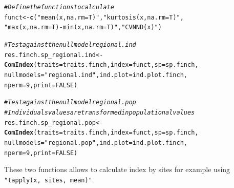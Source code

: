 \documentclass[12pt]{article}\usepackage[]{graphicx}\usepackage[]{color}
\makeatletter
\newcommand{\hlnum}[1]{\textcolor[rgb]{0.686,0.059,0.569}{#1}}%
\newcommand{\hlstr}[1]{\textcolor[rgb]{0.192,0.494,0.8}{#1}}%
\newcommand{\hlcom}[1]{\textcolor[rgb]{0.678,0.584,0.686}{\textit{#1}}}%
\newcommand{\hlstd}[1]{\textcolor[rgb]{0.345,0.345,0.345}{#1}}%
\newcommand{\hlkwb}[1]{\textcolor[rgb]{0.69,0.353,0.396}{#1}}%
\newcommand{\hlkwc}[1]{\textcolor[rgb]{0.333,0.667,0.333}{#1}}%
\newcommand{\hlkwd}[1]{\textcolor[rgb]{0.737,0.353,0.396}{\textbf{#1}}}%
\newenvironment{kframe}{%
 \def\at@end@of@kframe{}%
 \ifinner\ifhmode%
  \def\at@end@of@kframe{\end{minipage}}%
  \begin{minipage}{\columnwidth}%
 \fi\fi%
 \def\FrameCommand##1{\hskip\@totalleftmargin \hskip-\fboxsep
 \colorbox{shadecolor}{##1}\hskip-\fboxsep
     \hskip-\linewidth \hskip-\@totalleftmargin \hskip\columnwidth}%
 \MakeFramed {\advance\hsize-\width
   \@totalleftmargin\z@ \linewidth\hsize
   \@setminipage}}%
 {\par\unskip\endMakeFramed%
 \at@end@of@kframe}
\newenvironment{knitrout}{}{} %
\newcommand{\code}[1]{{{\tt #1}}}
\makeatother
\begin{document}
\begin{knitrout}
\color{fgcolor}\begin{kframe}
\begin{alltt}
\hlcom{#Define the function s to calculate}
\hlstd{funct}\hlkwb{<-}\hlkwd{c}\hlstd{(}\hlstr{"mean(x, na.rm = T)"}\hlstd{,} \hlstr{"kurtosis(x, na.rm = T)"}\hlstd{,}
     \hlstr{"max(x, na.rm = T) - min(x, na.rm = T)"}\hlstd{,} \hlstr{"CVNND(x)"} \hlstd{)}

\hlcom{#Test against the null model regional.ind}
\hlstd{res.finch.sp_regional.ind}\hlkwb{<-}\hlkwd{ComIndex}\hlstd{(}\hlkwc{traits} \hlstd{= traits.finch,} \hlkwc{index} \hlstd{= funct,} \hlkwc{sp} \hlstd{= sp.finch,}
                           \hlkwc{nullmodels} \hlstd{=} \hlstr{"regional.ind"}\hlstd{,} \hlkwc{ind.plot} \hlstd{= ind.plot.finch,}
                            \hlkwc{nperm} \hlstd{=} \hlnum{9}\hlstd{,} \hlkwc{print} \hlstd{=} \hlnum{FALSE}\hlstd{)}
\end{alltt}


{\ttfamily\noindent\bfseries{}}\begin{alltt}
\hlcom{#Test against the null model regional.pop}
\hlcom{#Individuals values are transformed in populational values}
\hlstd{res.finch.sp_regional.pop}\hlkwb{<-}\hlkwd{ComIndex}\hlstd{(}\hlkwc{traits} \hlstd{= traits.finch,} \hlkwc{index} \hlstd{= funct,} \hlkwc{sp} \hlstd{= sp.finch,}
               \hlkwc{nullmodels} \hlstd{=} \hlstr{"regional.pop"}\hlstd{,} \hlkwc{ind.plot} \hlstd{= ind.plot.finch,}
               \hlkwc{nperm} \hlstd{=} \hlnum{9}\hlstd{,} \hlkwc{print} \hlstd{=} \hlnum{FALSE}\hlstd{)}
\end{alltt}


{\ttfamily\noindent\bfseries{}}\end{kframe}
\end{knitrout}

These two functions allows to calculate  index by sites for example using \code{"tapply(x, sites, mean)"}.
\end{document}
